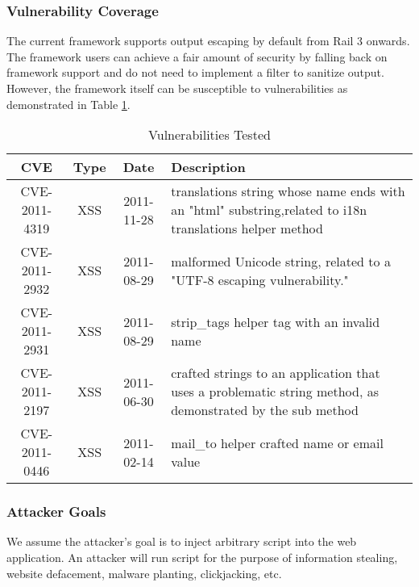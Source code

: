 \documentclass[10pt, conference, compsocconf]{IEEEtran}
\begin{document}
\subsubsection{Vulnerability Coverage}
The current framework supports output escaping by default from Rail 3 onwards. The framework users can achieve a fair amount of security by falling back on framework support and do not need to implement a filter to sanitize output. However, the framework itself  can be susceptible to vulnerabilities as demonstrated in Table \ref{tab:vulnerabilities}.

\begin{table}
\caption{Vulnerabilities Tested}
\label{tab:vulnerabilities}
\centering
\begin{tabular}{|c|c|c|p{2.5cm}|}
\hline

\bf{CVE}
& \bf{Type}
& \textbf{Date}
& \textbf{Description} \\

\hline
CVE-2011-4319
&XSS
&2011-11-28
& translations string whose name ends with an "html" substring,related to i18n translations helper method\\
\hline

CVE-2011-2932
& XSS
& 2011-08-29
& malformed Unicode string, related to a "UTF-8 escaping vulnerability." \\
\hline
CVE-2011-2931
& XSS
& 2011-08-29
& strip\_tags helper tag with an invalid name \\
\hline
CVE-2011-2197
& XSS
& 2011-06-30
& crafted strings to an application that uses a problematic string method, as demonstrated by the sub method \\
\hline
CVE-2011-0446
& XSS
& 2011-02-14
& mail\_to helper crafted name or email value \\
\hline
\end{tabular}
\end{table}

\subsubsection{Attacker Goals}
We assume the attacker's goal is to inject arbitrary script into the web application. An attacker will run script for the purpose of information stealing, website defacement, malware planting, clickjacking, etc.
\end{document}
